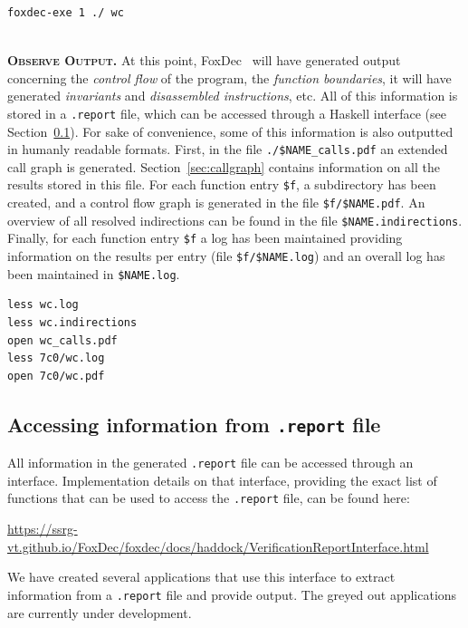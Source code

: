 \documentclass[12pt,a4paper]{article}
\newcommand{\begincodebox}[1]{
\vspace{1ex}
\begin{tcolorbox}[
    enhanced,
    attach boxed title to top left={xshift=6mm,yshift=-3mm},
    colback=moonstoneblue!20,
    colframe=moonstoneblue,
    colbacktitle=moonstoneblue,
    title=#1,
    fonttitle=\bfseries\color{black},
    boxed title style={size=small,colframe=moonstoneblue,sharp corners},
    sharp corners,
]
}
\newcommand{\codeboxend}{\end{tcolorbox}\noindent}
\newcommand{\foxdec}{\textsf{FoxDec}}
\newcommand{\beginpar}[1]{\noindent\textsc{\textbf{#1.}}}
\begin{document}
\begincodebox{Run FoxDec}
\begin{verbatim}
foxdec-exe 1 ./ wc
\end{verbatim}
\codeboxend
\\

\beginpar{Observe Output} 
At this point, \foxdec~ will have generated output concerning the \emph{control flow} of the program, the \emph{function boundaries}, it will have generated \emph{invariants} and \emph{disassembled instructions}, etc.
All of this information is stored in a \texttt{.report} file, which can be accessed through a Haskell interface (see Section~\ref{sec:interface}).
For sake of convenience, some of this information is also outputted in humanly readable formats.
First, in the file \texttt{./\$NAME\_calls.pdf} an extended call graph is generated.
Section~\ref{sec:callgraph} contains information on all the results stored in this file.
For each function entry \texttt{\$f}, a subdirectory has been created, and a control flow graph is generated in the file \texttt{\$f/\$NAME.pdf}.
An overview of all resolved indirections can be found in the file \texttt{\$NAME.indirections}.
Finally, for each function entry \texttt{\$f} a log has been maintained providing information on the results per entry (file \texttt{\$f/\$NAME.log}) and an overall log has been maintained in \texttt{\$NAME.log}.

\begincodebox{Observe output}
\begin{verbatim}
less wc.log
less wc.indirections
open wc_calls.pdf
less 7c0/wc.log
open 7c0/wc.pdf
\end{verbatim}
\codeboxend


\subsection{Accessing information from \texttt{.report} file}\label{sec:interface}

All information in the generated \texttt{.report} file can be accessed through an interface.
Implementation details on that interface, providing the exact list of functions that can be used to access the \texttt{.report} file, can be found here:
\begin{center}
\url{https://ssrg-vt.github.io/FoxDec/foxdec/docs/haddock/VerificationReportInterface.html}
\end{center}

We have created several applications that use this interface to extract information from a \texttt{.report} file and provide output.
The greyed out applications are currently under development.
\\
\end{document}
